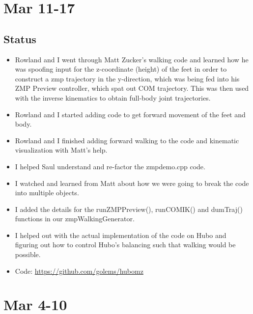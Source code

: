 \documentclass[letterpaper, 10 pt]{report}
\begin{document}
\section*{Mar 11-17}
\subsection*{Status}
\begin{itemize}
\item Rowland and I went through Matt Zucker's walking code and learned how he
was spoofing input for the z-coordinate (height) of the feet in order to
construct a zmp trajectory in the y-direction, which was being fed into his ZMP
Preview controller, which spat out COM trajectory. This was then used with the
inverse kinematics to obtain full-body joint trajectories.
\item Rowland and I started adding code to get forward movement of the feet and body.
\item Rowland and I finished adding forward walking to the code and kinematic
visualization with Matt's help.
\item I helped Saul understand and re-factor the zmpdemo.cpp code.
\item I watched and learned from Matt about how we were going to break the code into
multiple objects.
\item I added the details for the runZMPPreview(), runCOMIK() and dumTraj() functions
in our zmpWalkingGenerator.
\item I helped out with the actual implementation of the code on Hubo and figuring out
how to control Hubo's balancing such that walking would be possible.
\item Code: \url{https://github.com/golems/hubomz}
\end{itemize}

\section*{Mar 4-10}
\end{document}
